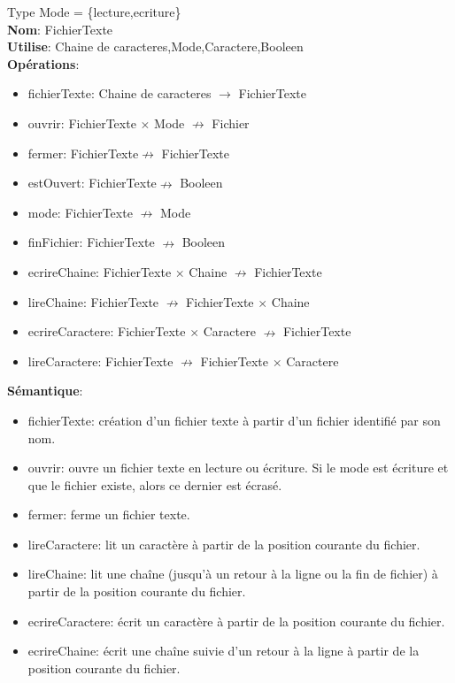 \documentclass{article}
\begin{document}
    \noindent
    Type Mode = \{lecture,ecriture\} \\
    \textbf{Nom}: FichierTexte \\
    \textbf{Utilise}: Chaine de caracteres,Mode,Caractere,Booleen \\
    \textbf{Opérations}: \begin{itemize}[label=$\ $, leftmargin=2cm, itemsep=0cm]
        \item fichierTexte: Chaine de caracteres $\rightarrow $ FichierTexte
        \item ouvrir: FichierTexte $ \times $ Mode $ \nrightarrow$ Fichier
        \item fermer: FichierTexte$  \nrightarrow $ FichierTexte
        \item estOuvert: FichierTexte$ \nrightarrow$  Booleen
        \item mode: FichierTexte $\nrightarrow $ Mode
        \item finFichier: FichierTexte $ \nrightarrow $ Booleen
        \item ecrireChaine: FichierTexte $ \times $ Chaine $ \nrightarrow$  FichierTexte
        \item lireChaine: FichierTexte $ \nrightarrow$  FichierTexte $ \times $ Chaine
        \item ecrireCaractere: FichierTexte $ \times $ Caractere $ \nrightarrow$  FichierTexte
        \item lireCaractere: FichierTexte $ \nrightarrow$  FichierTexte $ \times $ Caractere
    \end{itemize}
    
    \textbf{Sémantique}: \begin{itemize}[label=$\- $, leftmargin=2cm, itemsep=0cm]
        \item fichierTexte: création d’un fichier texte à partir d’un fichier identifié par son nom.
        \item ouvrir: ouvre un fichier texte en lecture ou écriture. Si le mode est écriture et que le fichier existe, alors ce dernier est écrasé.
        \item fermer: ferme un fichier texte.
        \item lireCaractere: lit un caractère à partir de la position courante du fichier.
        \item lireChaine: lit une chaîne (jusqu'à un retour à la ligne ou la fin de fichier) à partir de la position courante du fichier.
        \item ecrireCaractere: écrit un caractère à partir de la position courante du fichier.
        \item ecrireChaine: écrit une chaîne suivie d'un retour à la ligne à partir de la position courante du fichier.
    \end{itemize}
\end{document}
